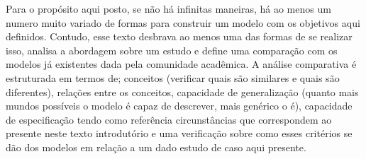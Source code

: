 Para o propósito aqui posto, se não há infinitas maneiras, há ao menos um numero muito variado de formas para construir um modelo com os objetivos aqui definidos. Contudo, esse texto desbrava ao menos uma das formas de se realizar isso, analisa a abordagem sobre um estudo e define uma comparação com os modelos já existentes dada pela comunidade acadêmica. A análise comparativa é estruturada em termos de; conceitos (verificar quais são similares e quais são diferentes), relações entre os conceitos, capacidade de generalização (quanto mais mundos possíveis o modelo é capaz de descrever, mais genérico o é), capacidade de especificação tendo como referência circunstâncias que correspondem ao presente neste texto introdutório e uma verificação sobre como esses critérios se dão dos modelos em relação a um dado estudo de caso aqui presente. 